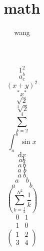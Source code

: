 \documentclass{article}
\author{wang}
\title{math}
\begin{document}
\maketitle
$$1^2$$
$$a^b_c$$
$$(x+y)^2$$
$${}^*\!x^*$$
$$\sqrt{2}$$
$$\sqrt[3]{2}$$
$$\sum_{k=2}^4$$
$$\int_a^b\sin{x}$$
$$\mathrm{d}x$$
$$a\!b$$
$$a\,b$$
$$a\;b$$
$$a\ b$$
$$a\quad b$$
$$a\qquad b$$
$$\left(\sum_{k=\frac{1}{2}}^{N^2}\frac{1}{k}\right)$$
$$\begin{matrix}
     0 & 1 \\
     1 & 0
\end{matrix}$$
$$\begin{pmatrix}1 & 2\\3 &4\end{pmatrix}$$
\end{document}

